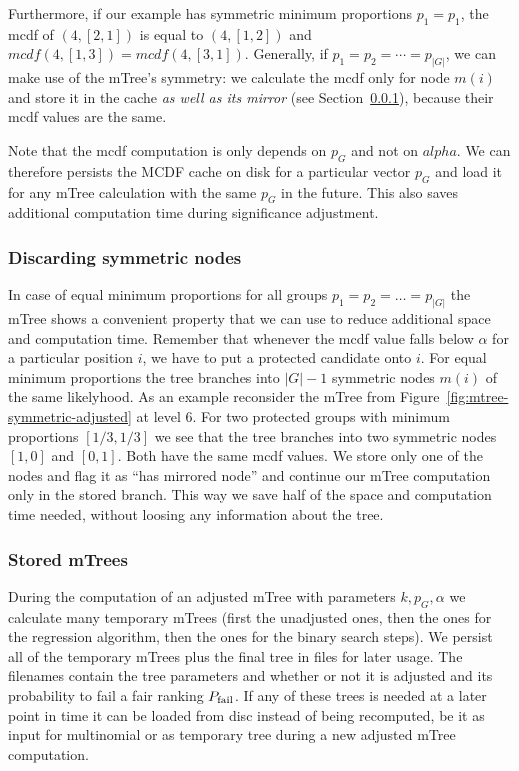 Furthermore, if our example has symmetric minimum proportions $p_1 = p_1$, the mcdf of $(4,[2,1])$ is equal to $(4,[1,2])$ and $\textit{mcdf}(4,[1,3]) = \textit{mcdf}(4,[3,1])$. 
%
Generally, if $p_1 = p_2 = \cdots = p_{|G|}$, we can make use of the mTree's symmetry: we calculate the mcdf only for node $m(i)$ and store it in the cache \emph{as well as its mirror} (see Section~\ref{subsubsec:discarding-symmetric-nodes}), because their mcdf values are the same.

Note that the mcdf computation is only depends on $p_G$ and not on $alpha$. 
%
We can therefore persists the MCDF cache on disk for a particular vector $p_G$ and load it for any mTree calculation with the same $p_G$ in the future.
%
This also saves additional computation time during significance adjustment.

\subsubsection{Discarding symmetric nodes}
\label{subsubsec:discarding-symmetric-nodes}
In case of equal minimum proportions for all groups $p_1 = p_2 = \ldots = p_|G|$ the mTree shows a convenient property that we can use to reduce additional space and computation time. 
%
Remember that whenever the mcdf value falls below $\alpha$ for a particular position $i$, we have to put a protected candidate onto $i$. 
%
For equal minimum proportions the tree branches into $|G| - 1$ symmetric nodes $m(i)$ of the same likelyhood.
%
As an example reconsider the mTree from Figure~\ref{fig:mtree-symmetric-adjusted} at level 6. 
%
For two protected groups with minimum proportions $[1/3, 1/3]$ we see that the tree branches into two symmetric nodes $[1, 0]$ and $[0,1]$. 
%
Both have the same mcdf values.
%
We store only one of the nodes and flag it as ``has mirrored node'' and continue our mTree computation only in the stored branch.
%
This way we save half of the space and computation time needed, without loosing any information about the tree. 

\subsubsection{Stored mTrees}
\label{subsubsec:stored-mtrees}
During the computation of an adjusted mTree with parameters $k,p_G , \alpha$ we calculate many temporary mTrees (first the unadjusted ones, then the ones for the regression algorithm, then the ones for the binary search steps).
%
We persist all of the temporary mTrees plus the final tree in files for later usage.
%
The filenames contain the tree parameters and whether or not it is adjusted and its probability to fail a fair ranking $P_{\operatorname{fail}}$.
%
If any of these trees is needed at a later point in time it can be loaded from disc instead of being recomputed, be it as input for multinomial \algoFAIR or as temporary tree during a new adjusted mTree computation.




